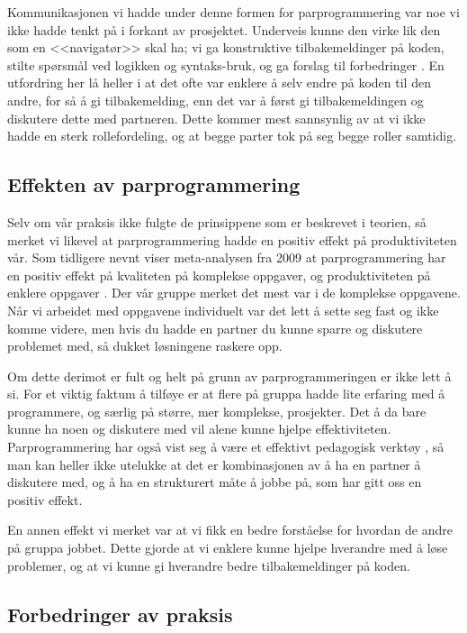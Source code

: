 Kommunikasjonen vi hadde under denne formen for parprogrammering var noe vi ikke hadde tenkt på i forkant av prosjektet.
Underveis kunne den virke lik den som en <<navigatør>> skal ha; vi ga konstruktive tilbakemeldinger på koden, stilte spørsmål ved logikken og syntaks-bruk, og ga forslag til forbedringer \cite{McDowell2006}.
En utfordring her lå heller i at det ofte var enklere å selv endre på koden til den andre, for så å gi tilbakemelding, enn det var å først gi tilbakemeldingen og diskutere dette med partneren.
Dette kommer mest sannsynlig av at vi ikke hadde en sterk rollefordeling, og at begge parter tok på seg begge roller samtidig.

\subsection{Effekten av parprogrammering}

Selv om vår praksis ikke fulgte de prinsippene som er beskrevet i teorien, så merket vi likevel at parprogrammering hadde en positiv effekt på produktiviteten vår.
Som tidligere nevnt viser meta-analysen fra 2009 at parprogrammering har en positiv effekt på kvaliteten på komplekse oppgaver, og produktiviteten på enklere oppgaver \cite{hannay2009}.
Der vår gruppe merket det mest var i de komplekse oppgavene.
Når vi arbeidet med oppgavene individuelt var det lett å sette seg fast og ikke komme videre, men hvis du hadde en partner du kunne sparre og diskutere problemet med, så dukket løsningene raskere opp.

Om dette derimot er fult og helt på grunn av parprogrammeringen er ikke lett å si.
For et viktig faktum å tilføye er at flere på gruppa hadde lite erfaring med å programmere, og særlig på større, mer komplekse, prosjekter.
Det å da bare kunne ha noen og diskutere med vil alene kunne hjelpe effektiviteten.
Parprogrammering har også vist seg å være et effektivt pedagogisk verktøy \cite{McDowell2006}, så man kan heller ikke utelukke at det er kombinasjonen av å ha en partner å diskutere med, og å ha en strukturert måte å jobbe på, som har gitt oss en positiv effekt.

En annen effekt vi merket var at vi fikk en bedre forståelse for hvordan de andre på gruppa jobbet.
Dette gjorde at vi enklere kunne hjelpe hverandre med å løse problemer, og at vi kunne gi hverandre bedre tilbakemeldinger på koden.


\subsection{Forbedringer av praksis}

